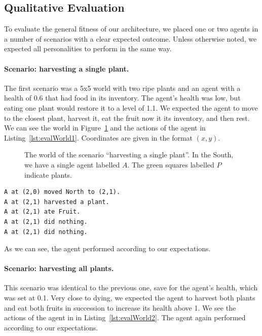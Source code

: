 \subsection{Qualitative Evaluation}

To evaluate the general fitness of our architecture, we placed one or two agents in a number of scenarios with a clear expected outcome. Unless otherwise noted, we expected all personalities to perform in the same way.

\paragraph{Scenario: harvesting a single plant.} The first scenario was a 5x5 world with two ripe plants and an agent with a health of 0.6 that had food in its inventory. The agent's health was low, but eating one plant would restore it to a level of 1.1. We expected the agent to move to the closest plant, harvest it, eat the fruit now it its inventory, and then rest. We can see the world in Figure~\ref{fig:evalWorld1} and the actions of the agent in Listing~\ref{lst:evalWorld1}. Coordinates are given in the format $(x,y)$.

\begin{figure}[h]
	\centering
	
	\caption{The world of the scenario ``harvesting a single plant''. In the South, we have a single agent labelled $A$. The green squares labelled $P$ indicate plants.}
	\label{fig:evalWorld1}
\end{figure}

\begin{lstlisting}[caption=Actions in the scenario ``harvesting a single plant''., label=lst:evalWorld1]
A at (2,0) moved North to (2,1).
A at (2,1) harvested a plant.
A at (2,1) ate Fruit.
A at (2,1) did nothing.
A at (2,1) did nothing.
\end{lstlisting}

As we can see, the agent performed according to our expectations.

\paragraph{Scenario: harvesting all plants.} This scenario was identical to the previous one, save for the agent's health, which was set at 0.1. Very close to dying, we expected the agent to harvest both plants and eat both fruits in succession to increase its health above 1. We see the actions of the agent in in Listing~\ref{lst:evalWorld2}. The agent again performed according to our expectations.

